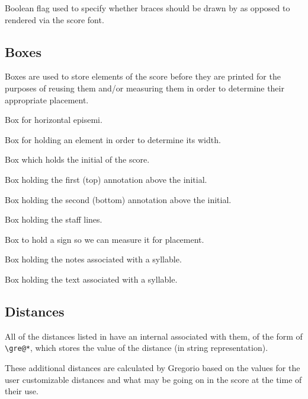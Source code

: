Boolean flag used to specify whether braces should be drawn by \MP{} as
opposed to rendered via the score font.

\subsection{Boxes}

Boxes are used to store elements of the score before they are printed for the purposes of reusing them and/or measuring them in order to determine their appropriate placement.

Box for horizontal episemi.

Box for holding an element in order to determine its width.

Box which holds the initial of the score.

Box holding the first (top) annotation above the initial.

Box holding the second (bottom) annotation above the initial.

Box holding the staff lines.

Box to hold a sign so we can measure it for placement.

Box holding the notes associated with a syllable.

Box holding the text associated with a syllable.



\subsection{Distances}
All of the distances listed in  have an internal
associated with them, of the form of \verb=\gre@*=, which stores the value of the distance (in
string representation).

These additional distances are calculated by Gregorio based on the values for the user customizable distances and what may be going on in the score at the time of their use.

